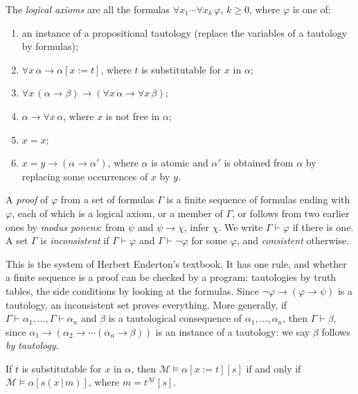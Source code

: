 \begin{definition}\label{def:proofsystem}
The \emph{logical axioms} are all the formulas $\forall x_1\cdots\forall x_k\,\varphi$, $k\ge0$, where $\varphi$ is one of:
\begin{enumerate}
\item[(A1)] an instance of a propositional tautology (replace the variables of a tautology by formulas);
\item[(A2)] $\forall x\,\alpha\to\alpha[x:=t]$, where $t$ is substitutable for $x$ in $\alpha$;
\item[(A3)] $\forall x\,(\alpha\to\beta)\to(\forall x\,\alpha\to\forall x\,\beta)$;
\item[(A4)] $\alpha\to\forall x\,\alpha$, where $x$ is not free in $\alpha$;
\item[(A5)] $x=x$;
\item[(A6)] $x=y\to(\alpha\to\alpha')$, where $\alpha$ is atomic and $\alpha'$ is obtained from $\alpha$ by replacing some occurrences of $x$ by $y$.
\end{enumerate}
A \emph{proof} of $\varphi$ from a set of formulas $\Gamma$ is a finite sequence of formulas ending with $\varphi$, each of which is a logical axiom, or a member of $\Gamma$, or follows from two earlier ones by \emph{modus ponens}: from $\psi$ and $\psi\to\chi$, infer $\chi$. We write $\Gamma\vdash\varphi$ if there is one. A set $\Gamma$ is \emph{inconsistent} if $\Gamma\vdash\varphi$ and $\Gamma\vdash\neg\varphi$ for some $\varphi$, and \emph{consistent} otherwise.
\end{definition}

This is the system of Herbert Enderton's textbook. It has one rule, and whether a finite sequence is a proof can be checked by a program: tautologies by truth tables, the side conditions by looking at the formulas. Since $\neg\varphi\to(\varphi\to\psi)$ is a tautology, an inconsistent set proves everything. More generally, if $\Gamma\vdash\alpha_1,\dots,\Gamma\vdash\alpha_n$ and $\beta$ is a tautological consequence of $\alpha_1,\dots,\alpha_n$, then $\Gamma\vdash\beta$, since $\alpha_1\to(\alpha_2\to\cdots(\alpha_n\to\beta))$ is an instance of a tautology: we say $\beta$ follows \emph{by tautology}.

\begin{lemma}[substitution]\label{lem:substitution}
If $t$ is substitutable for $x$ in $\alpha$, then $\mathcal M\models\alpha[x:=t][s]$ if and only if $\mathcal M\models\alpha[s(x\,|\,m)]$, where $m=t^{\mathcal M}[s]$.
\end{lemma}


